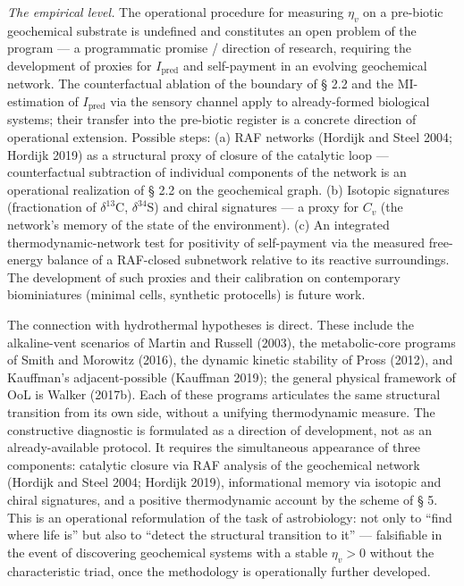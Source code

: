\documentclass[pdflatex,sn-mathphys-ay]{sn-jnl}
\begin{document}
\emph{The empirical level.} The operational procedure for measuring \(\eta_v\) on a pre-biotic geochemical substrate is undefined and constitutes an open problem of the program --- a programmatic promise / direction of research, requiring the development of proxies for \(I_{\text{pred}}\) and self-payment in an evolving geochemical network. The counterfactual ablation of the boundary of § 2.2 and the MI-estimation of \(I_{\text{pred}}\) via the sensory channel apply to already-formed biological systems; their transfer into the pre-biotic register is a concrete direction of operational extension. Possible steps: (a) RAF networks (Hordijk and Steel 2004; Hordijk 2019) as a structural proxy of closure of the catalytic loop --- counterfactual subtraction of individual components of the network is an operational realization of § 2.2 on the geochemical graph. (b) Isotopic signatures (fractionation of \(\delta^{13}\mathrm{C}\), \(\delta^{34}\mathrm{S}\)) and chiral signatures --- a proxy for \(C_v\) (the network's memory of the state of the environment). (c) An integrated thermodynamic-network test for positivity of self-payment via the measured free-energy balance of a RAF-closed subnetwork relative to its reactive surroundings. The development of such proxies and their calibration on contemporary biominiatures (minimal cells, synthetic protocells) is future work.

The connection with hydrothermal hypotheses is direct. These include the alkaline-vent scenarios of Martin and Russell (2003), the metabolic-core programs of Smith and Morowitz (2016), the dynamic kinetic stability of Pross (2012), and Kauffman's adjacent-possible (Kauffman 2019); the general physical framework of OoL is Walker (2017b). Each of these programs articulates the same structural transition from its own side, without a unifying thermodynamic measure. The constructive diagnostic is formulated as a direction of development, not as an already-available protocol. It requires the simultaneous appearance of three components: catalytic closure via RAF analysis of the geochemical network (Hordijk and Steel 2004; Hordijk 2019), informational memory via isotopic and chiral signatures, and a positive thermodynamic account by the scheme of § 5. This is an operational reformulation of the task of astrobiology: not only to ``find where life is'' but also to ``detect the structural transition to it'' --- falsifiable in the event of discovering geochemical systems with a stable \(\eta_v > 0\) without the characteristic triad, once the methodology is operationally further developed.
\end{document}
